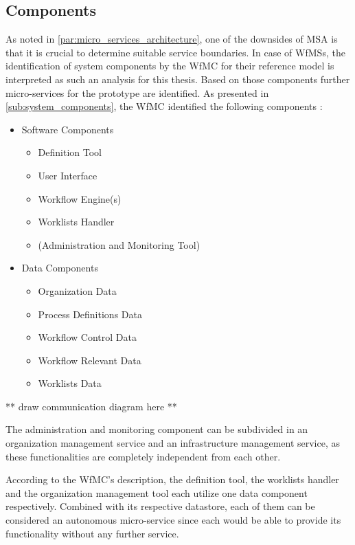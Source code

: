 \subsection{Components} %
  \label{sub:components}
  As noted in \ref{par:micro_services_architecture}, one of the downsides of \ac{MSA} is that it is crucial to determine suitable service boundaries. In case of \acp{WfMS}, the identification of system components by the \ac{WfMC} for their reference model is interpreted as such an analysis for this thesis. Based on those components further micro-services for the prototype are identified. As presented in \ref{sub:system_components}, the \ac{WfMC} identified the following components \cite[p.~13]{Hollingsworth1995Wfmc}:
    \begin{itemize}[nosep]
      \item Software Components
        \begin{itemize}[nosep]
          \item Definition Tool %
          \item User Interface
          \item Workflow Engine(s)
          \item Worklists Handler %
          \item (Administration and Monitoring Tool) %
        \end{itemize}
      \item Data Components
        \begin{itemize}[nosep]
          \item Organization Data %
          \item Process Definitions Data %
          \item Workflow Control Data
          \item Workflow Relevant Data %
          \item Worklists Data %
        \end{itemize}
    \end{itemize}

    ** draw communication diagram here **

  The administration and monitoring component can be subdivided in an organization management service and an infrastructure management service, as these functionalities are completely independent from each other.

  According to the \ac{WfMC}'s description, the definition tool, the worklists handler and the organization management tool each utilize one data component respectively. Combined with its respective datastore, each of them can be considered an autonomous micro-service since each would be able to provide its functionality without any further service.

